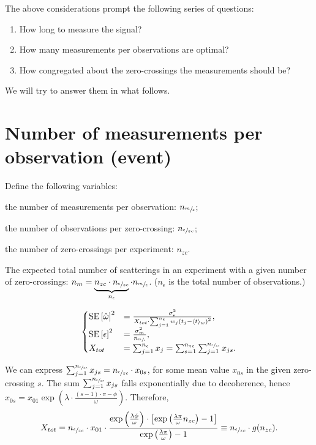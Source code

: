 \documentclass{article}
\newcommand{\obs}{\epsilon}
\newcommand{\meas}{m}
\begin{document}
The above considerations prompt the following series of questions:
\begin{enumerate}
	\item How long to measure the signal?
	\item How many measurements per observations are optimal?
	\item How congregated about the zero-crossings the measurements should be?
\end{enumerate}
We will try to answer them in what follows.

\section{Number of measurements per observation (event)}
\newcommand{\Nmo}{n_{\sfrac{\meas}{\obs}}}
\newcommand{\Nozc}{n_{\sfrac{\obs}{zc}}}
\newcommand{\Nzc}{n_{zc}}
\newcommand{\No}{n_{\obs}}

Define the following variables: \begin{inparaenum}
	\item the number of measurements per observation: $\Nmo$;
	\item the number of observations per zero-crossing: $\Nozc$;
	\item the number of zero-crossings per experiment: $\Nzc$.
\end{inparaenum}

The expected total number of scatterings in an experiment with a given number of zero-crossings: $n_m = \underbrace{\Nzc\cdot\Nozc}_{\No}\cdot\Nmo$. ($\No$ is the total number of observations.)

\begin{equation}
\begin{cases}
	\SE{\hat{\omega}}^2 &= \frac{\SD{\obs}^2}{X_{tot}\cdot\sum_{j=1}^{\No}w_j\bkt{t_j - \avg{t}_w}^2}, \\
	\SE{\obs}^2 &= \frac{\SD{\meas}^2}{\Nmo} ,\\
	X_{tot} &= \sum_{j=1}^{\No} x_j = \sum_{s=1}^{\Nzc}\sum_{j=1}^{\Nozc} x_{js}.
\end{cases}
\end{equation}

We can express $\sum_{j=1}^{\Nozc} x_{js} = \Nozc \cdot x_{0s}$, for some mean value $x_{0s}$ in the given zero-crossing $s$. The sum $\sum_{j=1}^{\Nozc} x_{js}$ falls exponentially due to decoherence, hence $x_{0s} = x_{01}\exp{(\lambda\cdot \frac{(s-1)\cdot\pi - \phi}{\omega})}$. Therefore,
\[
	X_{tot} = \Nozc\cdot x_{01} \cdot \frac{\exp{\bkt{\frac{\lambda\phi}{\omega}}}\cdot\bkt*{\exp{\bkt{\frac{\lambda\pi}{\omega}\Nzc}}-1}}{\exp{\bkt{\frac{\lambda\pi}{\omega}}}-1} \equiv \Nozc \cdot g(\Nzc).
\]
\end{document}
